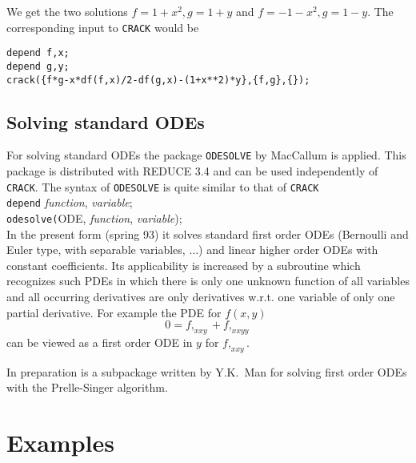 We get the two solutions $f = 1 + x^2, g = 1 + y$ and 
$f = - 1 - x^2, g = 1 - y.$ The corresponding input to {\tt CRACK} would be
\begin{verbatim}
depend f,x;
depend g,y;
crack({f*g-x*df(f,x)/2-df(g,x)-(1+x**2)*y},{f,g},{});
\end{verbatim}
 
\subsection{Solving standard ODEs}
For solving standard ODEs the package {\tt ODESOLVE} by MacCallum 
\cite{Mal} is applied. This package is distributed with REDUCE 3.4
and can be used independently of {\tt CRACK}. The syntax of
{\tt ODESOLVE} is quite similar to that of {\tt CRACK} \\
\verb+depend+ {\it function}, {\it variable}; \\
\verb+odesolve(+ODE, {\it function}, {\it variable});  \\
In the present form (spring 93) it solves standard first order ODEs
(Bernoulli and Euler type, with separable variables, $\ldots$) and linear
higher order ODEs with constant coefficients. Its applicability is 
increased by a subroutine which recognizes such PDEs in which there is only
one unknown function of all variables and all occurring derivatives
are only derivatives w.r.t. one variable of only one partial derivative.
For example the PDE for $f(x,y)$
\[ 0 = f,_{xxy} + f,_{xxyy} \]
can be viewed as a first order ODE in $y$ for $f,_{xxy}.$

In preparation is a subpackage
written by Y.K.\ Man for solving first order ODEs with the Prelle-Singer
algorithm. 

\section{Examples}
